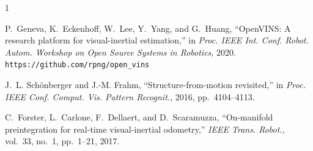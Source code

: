 \documentclass[journal]{IEEEtran}
\begin{document}
%
%
%
\begin{thebibliography}{1}

P.~Geneva, K.~Eckenhoff, W.~Lee, Y.~Yang, and G.~Huang,
``OpenVINS: A research platform for visual-inertial estimation,''
in \emph{Proc. IEEE Int. Conf. Robot. Autom. Workshop on Open Source
Systems in Robotics}, 2020. \texttt{https://github.com/rpng/open\_vins}

J.~L. Sch\"onberger and J.-M. Frahm,
``Structure-from-motion revisited,''
in \emph{Proc. IEEE Conf. Comput. Vis. Pattern Recognit.}, 2016,
pp.~4104--4113.

C.~Forster, L.~Carlone, F.~Dellaert, and D.~Scaramuzza,
``On-manifold preintegration for real-time visual-inertial odometry,''
\emph{IEEE Trans. Robot.}, vol.~33, no.~1, pp.~1--21, 2017.

\end{thebibliography}

%
%





\end{document}
